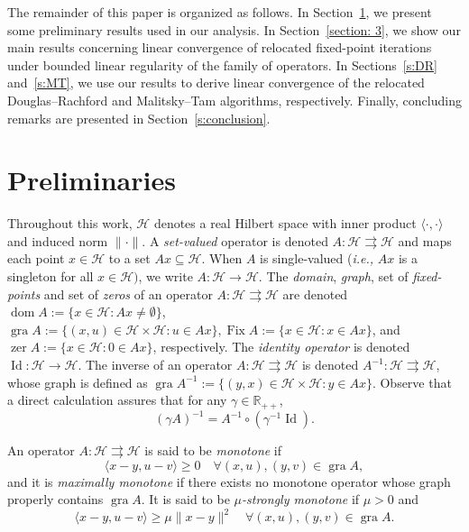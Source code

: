 \documentclass[a4paper,12pt]{article}
\DeclareMathOperator{\Id}{Id}
\DeclareMathOperator{\Fix}{Fix}
\DeclareMathOperator{\gra}{gra}
\DeclareMathOperator{\zer}{zer}
\DeclareMathOperator{\dom}{dom}
\newcommand{\setto}{\rightrightarrows}
\begin{document}
The remainder of this paper is organized as follows. In Section~\ref{section:preliminaries}, we present some preliminary results used in our analysis. In Section~\ref{section: 3}, we show our main results concerning linear convergence of relocated fixed-point iterations under bounded linear regularity of the family of operators. In Sections~\ref{s:DR} and~\ref{s:MT}, we use our results to derive linear convergence of the relocated Douglas--Rachford and Malitsky--Tam algorithms, respectively. Finally, concluding remarks are presented in Section~\ref{s:conclusion}.








\section{Preliminaries} \label{section:preliminaries}


Throughout this work, $\mathcal{H}$ denotes a real Hilbert space with inner product $\langle\cdot,\cdot\rangle$ and induced norm $\|\cdot\|$. A \emph{set-valued} operator is denoted $A:\mathcal{H}\setto\mathcal{H}$ and maps each point $x\in\mathcal{H}$ to a set $Ax\subseteq\mathcal{H}$. When $A$ is single-valued (\emph{i.e.,} $Ax$ is a singleton for all $x\in\mathcal{H})$, we write $A:\mathcal{H}\rightarrow\mathcal{H}$. The \emph{domain},  \emph{graph},  set of \emph{fixed-points} and set of \emph{zeros} of an operator $A\colon\mathcal{H}\setto\mathcal{H}$ are denoted $\dom A:=\{x\in\mathcal{H}:Ax\neq\emptyset\}$, 
$\gra A:=\{(x,u)\in \mathcal{H}\times\mathcal{H}:u\in Ax\}, \Fix A:=\{x\in \mathcal{H}:x\in Ax\}$, and $\zer A:=\{x\in \mathcal{H}:0\in Ax\}$, respectively. The \emph{identity operator} is denoted $\Id:\mathcal{H}\rightarrow \mathcal{H}$. The inverse of an operator $A:\mathcal{H}\setto\mathcal{H}$ is denoted $A^{-1}:\mathcal{H}\setto\mathcal{H}$, whose graph is defined as $\gra A^{-1}:=\{(y,x)\in\mathcal{H}\times\mathcal{H}:y\in Ax\}$. Observe that a direct calculation assures that for any $\gamma \in \mathbb{R}_{++}$, \begin{equation} \label{eq:escaled-inverse}
    (\gamma A)^{-1} = A^{-1}\circ (\gamma^{-1} \Id).
\end{equation}


An operator $A:\mathcal{H}\setto\mathcal{H}$ is said to be \emph{monotone} if 
$$\langle x-y,u-v\rangle\geq0\quad\forall(x,u),(y,v)\in\gra A,$$
and it is \emph{maximally monotone} if there exists no monotone operator whose graph properly contains $\gra A$.
 It is said to be \emph{$\mu$-strongly monotone} if $\mu>0$ and $$\langle x-y,u-v\rangle\geq\mu\|x-y\|^2\quad\forall(x,u),(y,v)\in\gra A.$$
\end{document}

